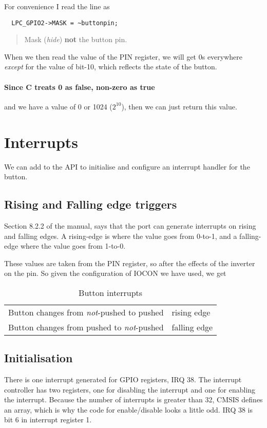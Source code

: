 \documentclass[a4paper]{tufte-handout}
\begin{document}
For convenience I read the line
as
\begin{verbatim}
  LPC_GPIO2->MASK = ~buttonpin;
\end{verbatim}
\begin{quote}
  Mask (\emph{hide}) \textbf{not} the button pin.
\end{quote}
When we then read the value of the PIN register, we will get 0s
everywhere \emph{except} for the value of bit-10, which reflects the
state of the button.
\paragraph{Since C treats 0 as false, non-zero as true} and we have a
value of 0 or 1024 ($2^{10}$), then we can just return this
value.

\clearpage
\section{Interrupts}
  We can add to the API to initialise and configure an
interrupt handler for the button.

\subsection{Rising and Falling edge triggers}
Section 8.2.2 of the manual, says that the port can generate
interrupts on rising and falling edges.  A rising-edge is where the
value goes from 0-to-1, and a falling-edge where the value goes from
1-to-0. 

These values are taken from the PIN register, so after the effects of
the inverter on the pin.  So given the configuration of IOCON we have
used, we get
\begin{table}
  \begin{tabular}{ll}
    Button changes from \emph{not}-pushed to pushed&rising edge\\
    Button changes from pushed to \emph{not}-pushed&falling edge\\
  \end{tabular}
  \caption{Button interrupts}
  \label{tab:buttonedges}
\end{table}

\subsection{Initialisation}
There is one interrupt generated for GPIO registers, IRQ 38.  The
interrupt controller has two registers, one for disabling the
interrupt and one for enabling the interrupt.  Because the number of
interrupts is greater than 32, CMSIS defines an array, which is why
the code for enable/disable looks a little odd.  IRQ 38 is bit 6 in
interrupt register 1.
\end{document}
